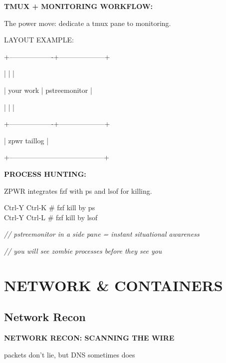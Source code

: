 \documentclass[11pt,a4paper,twoside]{book}
\begin{document}
\vspace{12pt}
{\bfseries\color{neonyellow} TMUX + MONITORING WORKFLOW:}\vspace{4pt}

The power move: dedicate a tmux pane to monitoring.

LAYOUT EXAMPLE:

+-------------------+--------------------+

|                   |                    |

|   your work       |  pstreemonitor     |

|                   |                    |

+-------------------+--------------------+

|         zpwr taillog                   |

+-----------------------------------------+


\vspace{12pt}
{\bfseries\color{neonyellow} PROCESS HUNTING:}\vspace{4pt}

ZPWR integrates fzf with ps and lsof for killing.

\begin{codebox}
Ctrl-Y Ctrl-K                  \# fzf kill by ps\\
Ctrl-Y Ctrl-L                  \# fzf kill by lsof\\
\end{codebox}

{\small\itshape\color{dimtext} // pstreemonitor in a side pane = instant situational awareness}

{\small\itshape\color{dimtext} // you will see zombie processes before they see you}


\vspace{16pt}


\chapter{NETWORK \& CONTAINERS}

\section{Network Recon}


\vspace{10pt}
{\large\bfseries\color{neoncyan} NETWORK RECON: SCANNING THE WIRE}\vspace{6pt}

packets don't lie, but DNS sometimes does
\end{document}
